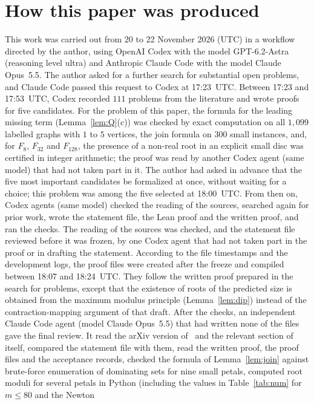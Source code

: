 \documentclass[11pt]{article}
\theoremstyle{definition}
\theoremstyle{remark}
\begin{document}
\section*{How this paper was produced}
This work was carried out from 20 to 22 November 2026 (UTC) in a workflow directed by
the author, using OpenAI Codex with the model GPT-6.2-Astra (reasoning level
ultra) and Anthropic Claude Code with the model Claude Opus~5.5. The author
asked for a further search for substantial open problems, and Claude Code
passed this request to Codex at 17:23~UTC. Between 17:23 and 17:53~UTC, Codex
recorded $111$ problems from the literature and wrote proofs for five
candidates. For the problem of this paper, the formula for the leading
missing term (Lemma~\ref{lem:Q}(c)) was checked by exact computation on all
$1{,}099$ labelled graphs with $1$ to $5$ vertices, the join formula on $300$
small instances, and, for $F_8$, $F_{32}$ and $F_{128}$, the presence of a
non-real root in an explicit small disc was certified in integer
arithmetic; the proof was read by another Codex agent (same model)
that had not taken part in it. The author had asked in advance that the five
most important candidates be formalized at once, without waiting for a
choice; this problem was among the five selected at 18:00~UTC. From then on,
Codex agents (same model) checked the reading of the sources, searched again
for prior work, wrote the statement file, the Lean proof and the written
proof, and ran the checks. The reading of the sources was checked, and the
statement file reviewed before it was frozen, by one Codex agent that had not
taken part in the proof or in drafting the statement. According to the file
timestamps and the development logs, the proof files were created after the
freeze and compiled between 18:07 and 18:24~UTC. They follow the written
proof prepared in the search for problems, except that the existence of roots
of the predicted size is obtained from the maximum modulus principle
(Lemma~\ref{lem:dip}) instead of the contraction-mapping argument of that
draft. After the checks, an independent Claude Code agent (model Claude
Opus~5.5) that had written none of the files gave the final review. It read
the arXiv version of~\cite{abj} and the relevant section of~\cite{ra} itself,
compared the statement file with them, read the written proof, the proof
files and the acceptance records, checked the formula of
Lemma~\ref{lem:join} against brute-force enumeration of dominating sets for
nine small petals, computed root moduli for several petals in Python
(including the values in Table~\ref{tab:num} for $m\le80$ and the Newton
\end{document}
